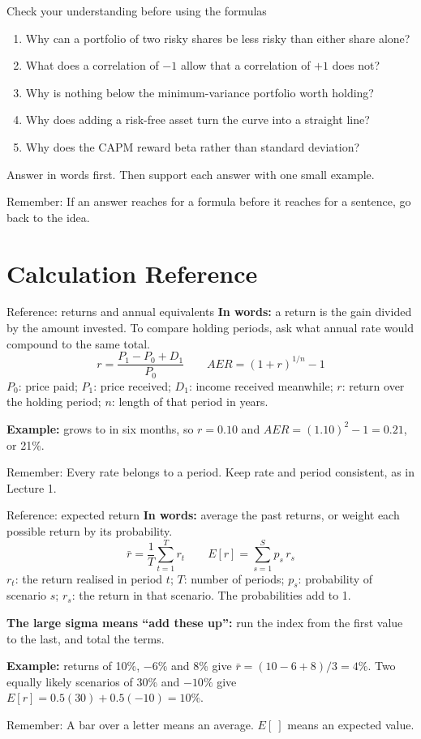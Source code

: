 \documentclass[10pt,aspectratio=169]{beamer}
\newcommand{\remember}[1]{\par\smallskip\alert{Remember:} #1}
\renewcommand{\pounds}{\ifmmode\text{\textsterling}\else\textsterling\fi}
\begin{document}
\begin{frame}{Check your understanding before using the formulas}
\begin{enumerate}
\item Why can a portfolio of two risky shares be less risky than either share alone?
\item What does a correlation of $-1$ allow that a correlation of $+1$ does not?
\item Why is nothing below the minimum-variance portfolio worth holding?
\item Why does adding a risk-free asset turn the curve into a straight line?
\item Why does the CAPM reward beta rather than standard deviation?
\end{enumerate}
\par\smallskip
Answer in words first. Then support each answer with one small example.
\remember{If an answer reaches for a formula before it reaches for a sentence, go back to the idea.}
\end{frame}

\section{Calculation Reference}
\begin{frame}[label=returns]{Reference: returns and annual equivalents}
\textbf{In words:} a return is the gain divided by the amount invested. To compare holding periods, ask what annual rate would compound to the same total.
\[
r=\frac{P_1-P_0+D_1}{P_0}\qquad AER=(1+r)^{1/n}-1
\]
$P_0$: price paid; $P_1$: price received; $D_1$: income received meanwhile; $r$: return over the holding period; $n$: length of that period in years.

\par\smallskip
\textbf{Example:} \pounds100 grows to \pounds110 in six months, so $r=0.10$ and $AER=(1.10)^{2}-1=0.21$, or 21\%.
\remember{Every rate belongs to a period. Keep rate and period consistent, as in Lecture 1.}
\end{frame}

\begin{frame}[label=expected]{Reference: expected return}
\textbf{In words:} average the past returns, or weight each possible return by its probability.
\[
\bar{r}=\frac{1}{T}\sum_{t=1}^{T}r_t\qquad E[r]=\sum_{s=1}^{S}p_s\,r_s
\]
$r_t$: the return realised in period $t$; $T$: number of periods; $p_s$: probability of scenario $s$; $r_s$: the return in that scenario. The probabilities add to 1.
\par\smallskip
\textbf{The large sigma means ``add these up'':} run the index from the first value to the last, and total the terms.
\par\smallskip
\textbf{Example:} returns of 10\%, $-6\%$ and 8\% give $\bar{r}=(10-6+8)/3=4\%$. Two equally likely scenarios of 30\% and $-10\%$ give $E[r]=0.5(30)+0.5(-10)=10\%$.
\remember{A bar over a letter means an average. $E[\ ]$ means an expected value.}
\end{frame}
\end{document}
